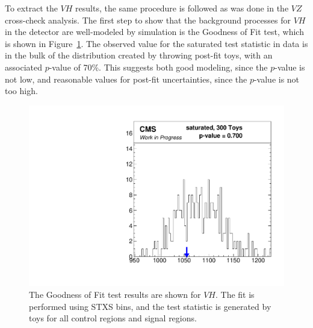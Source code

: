 To extract the $V\!H$ results, the same procedure is followed as was done in the $V\!Z$ cross-check analysis.
The first step to show that the background processes for $V\!H$ in the detector are well-modeled
by simulation is the Goodness of Fit test, which is shown in Figure~\ref{fig:vh-gof}.
The observed value for the saturated test statistic in data is in the bulk of the distribution created by throwing
post-fit toys, with an associated $p$-value of 70\%.
This suggests both good modeling, since the $p$-value is not low,
and reasonable values for post-fit uncertainties, since the $p$-value is not too high.
%
\begin{figure}
  \centering
  \includegraphics[width=0.65\linewidth]{figures/210308_STXSfine_400split_Xbb_8f854f5a_inclusive_gof/Gof_inclusive_.pdf}
  \caption[Goodness of Fit for $V\!H$]{
    The Goodness of Fit test results are shown for $V\!H$.
    The fit is performed using STXS bins,
    and the test statistic is generated by toys for all control regions and signal regions.
  }
  \label{fig:vh-gof}
\end{figure}

